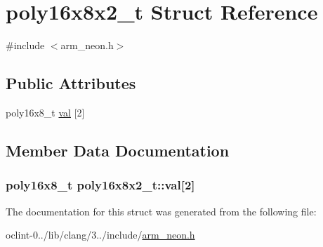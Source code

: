 \hypertarget{structpoly16x8x2__t}{\section{poly16x8x2\-\_\-t Struct Reference}
\label{structpoly16x8x2__t}
}


{\ttfamily \#include $<$arm\-\_\-neon.\-h$>$}

\subsection*{Public Attributes}
\begin{DoxyCompactItemize}
\item 
poly16x8\-\_\-t \hyperlink{structpoly16x8x2__t_aedcf0d4e750cb257c747ee591fc40992}{val} \mbox{[}2\mbox{]}
\end{DoxyCompactItemize}


\subsection{Member Data Documentation}
\hypertarget{structpoly16x8x2__t_aedcf0d4e750cb257c747ee591fc40992}{
\subsubsection[{val}]{\setlength{\rightskip}{0pt plus 5cm}poly16x8\-\_\-t poly16x8x2\-\_\-t\-::val\mbox{[}2\mbox{]}}}\label{structpoly16x8x2__t_aedcf0d4e750cb257c747ee591fc40992}


The documentation for this struct was generated from the following file\-:\begin{DoxyCompactItemize}
\item 
oclint-\/0../lib/clang/3../include/\hyperlink{arm__neon_8h}{arm\-\_\-neon.\-h}\end{DoxyCompactItemize}
